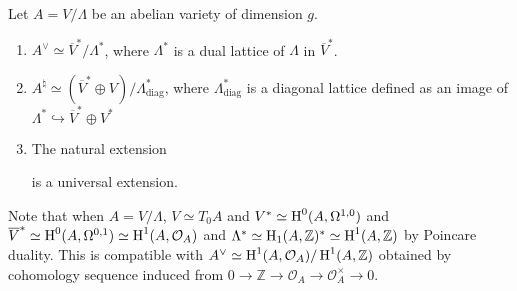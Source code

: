 \begin{theorem}[Arinkin]
Let $A = V / \Lambda$ be an abelian variety of dimension $g$.
\begin{enumerate}
    \item $A^\vee \simeq \overline{V}^{*} / \Lambda^{*}$, where $\Lambda^{*}$ is a dual lattice of $\Lambda$ in $\overline{V}^{*}$.
    \item $A^\natural \simeq (\overline{V}^{*} \oplus V) / \Lambda^{*}_{\mathrm{diag}}$, where $\Lambda^{*}_{\mathrm{diag}}$ is a diagonal lattice
    defined as an image of $\Lambda^{*} \hookrightarrow \overline{V}^{*} \oplus V^{*}$
    \item The natural extension 
    \begin{center}
    \end{center}
    is a universal extension.
\end{enumerate}
\end{theorem}
Note that when $A = V /\Lambda$, $V \simeq T_{0}A$ and $V^{*} \simeq \operatorname{\mathrm{H}}^{0}(A, \Omega^{1,0})$ and $\overline{V}^{*} \simeq \operatorname{\mathrm{H}}^{0}(A, \Omega^{0,1}) \simeq \operatorname{\mathrm{H}}^{1}(A, \mathcal{O}_A)$
and $\Lambda^{*} \simeq \operatorname{\mathrm{H}}_1(A, \mathbb{Z})^{*} \simeq \operatorname{\mathrm{H}}^{1}(A, \mathbb{Z})$ by Poincare duality.
This is compatible with $A^\vee \simeq \operatorname{\mathrm{H}}^{1}(A, \mathcal{O}_A) / \operatorname{\mathrm{H}}^{1}(A, \mathbb{Z})$ obtained by cohomology sequence
induced from $0 \to \mathbb{Z} \to \mathcal{O}_A \to \mathcal{O}_A^{\times} \to 0$.

